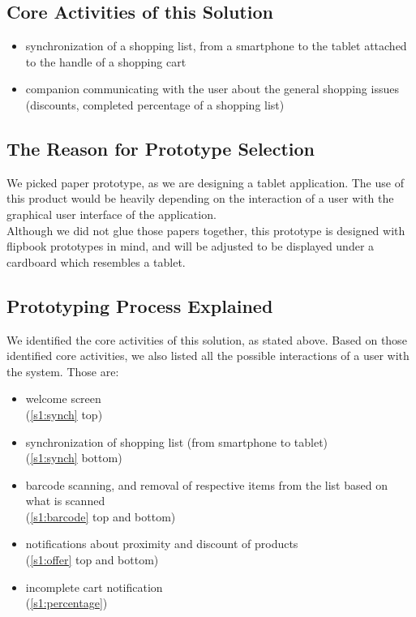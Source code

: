 \subsection{Core Activities of this Solution}

\begin{itemize}
	\item synchronization of a shopping list, from a smartphone to the tablet attached to the handle of a shopping cart
	
	
	\item companion communicating with the user about the general shopping issues (discounts, completed percentage of a shopping list)
\end{itemize}

\subsection{The Reason for Prototype Selection}

We picked paper prototype, as we are designing a tablet application. The use of this product would be heavily depending on the interaction of a user with the graphical user interface of the application.\\

Although we did not glue those papers together, this prototype is designed with flipbook prototypes in mind, and will be adjusted to be displayed under a cardboard which resembles a tablet.

\subsection{Prototyping Process Explained}

We identified the core activities of this solution, as stated above. Based on those identified core activities, we also listed all the possible interactions of a user with the system. Those are:
\begin{itemize}
	\item welcome screen\\
	(\autoref{s1:synch} top)
	
	\item synchronization of shopping list (from smartphone to tablet)\\
	(\autoref{s1:synch} bottom)
	
	\item barcode scanning, and removal of respective items from the list based on what is scanned\\
	(\autoref{s1:barcode} top and bottom)
	
	\item notifications about proximity and discount of products \\
	(\autoref*{s1:offer} top and bottom)
	
	\item incomplete cart notification \\
	(\autoref{s1:percentage})
\end{itemize}

